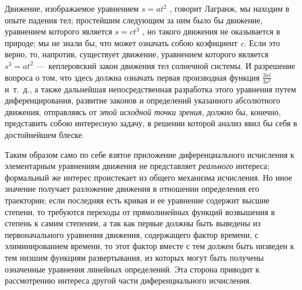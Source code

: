 {Движение, изображаемое уравнением  $s=at^2$ , говорит Лагранж, мы находим в
опыте падения тел; простейшим следующим за ним было бы движение, уравнением
которого является  $s=ct^3$ , но такого движения не оказывается в природе;
мы не знали бы, что может означать собою коэфициент
{\em c}. Если это верно, то, напротив, существует
движение, уравнением которого является  $s^3=at^2$  —~кеплеровский закон
движения тел солнечной системы. И разрешение вопроса о том, что здесь
должна означать первая производная функция  $\frac{2\mathit{at}}{3s^2}$ 
и~т.~д., а также дальнейшая непосредственная разработка этого уравнения
путем диференцирования, развитие законов и определений указанного
абсолютного движения, отправляясь от {\em этой исходной
точки зрения}, должно бы, конечно, представить собою интересную задачу, в
решении которой анализ явил бы себя в достойнейшем блеске.

Таким образом само по себе взятое приложение диференциального исчисления к
элементарным уравнениям движения не представляет
{\em реального} интереса; формальный же интерес
проистекает из общего механизма исчисления. Но иное значение получает
разложение движения в отношении определения его траектории; если последняя
есть кривая и ее уравнение содержит высшие степени, то требуются переходы
от прямолинейных функций возвышения в степень к самим степеням, а так как
первые должны быть выведены из первоначального уравнения движения,
содержащего фактор времени, с элиминированием времени, то этот фактор
вместе с тем должен быть низведен к тем низшим функциям развертывания, из
которых могут быть получены означенные уравнения линейных определений. Эта
сторона приводит к рассмотрению интереса другой части диференциального
исчисления.

}
